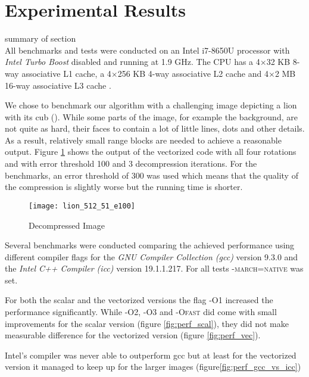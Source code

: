 \section{Experimental Results}\label{sec:exp}

summary of section\\

 All benchmarks and tests were conducted on an Intel
i7-8650U processor with \textit{Intel Turbo Boost} disabled and running at 1.9
GHz. The CPU has a 4$\times$32 KB 8-way associative L1 cache, a 4$\times$256 KB
4-way associative L2 cache and 4$\times$2 MB 16-way associative L3 cache
\cite{intel-opt-manual}.

We chose to benchmark our algorithm with a challenging image depicting a lion
with its cub (\cite{lions}). While some parts of the image, for example the
background, are not quite as hard, their faces to contain a lot of little lines,
dots and other details. As a result, relatively small range blocks are needed to
achieve a reasonable output. Figure \ref{fig:lions} shows the output of the
vectorized code with all four rotations and with error threshold 100 and 3
decompression iterations. For the benchmarks, an error threshold of 300 was used
which means that the quality of the compression is slightly worse but the
running time is shorter.

\begin{figure}[H]
  \centering
  \texttt{[image: lion\_512\_51\_e100]}
  \caption{Decompressed Image}
  \label{fig:lions}
\end{figure}


 Several benchmarks were conducted comparing the achieved
performance using different compiler flags for the \textit{GNU Compiler
  Collection (gcc)} version 9.3.0 and the \textit{Intel C++ Compiler (icc)}
version 19.1.1.217. For all tests \textsc{-march=native} was set.

For both the scalar and the vectorized versions the flag \textsc{-O1} increased
the performance significantly. While \textsc{-O2}, \textsc{-O3} and
\textsc{-Ofast} did come with small improvements for the scalar version (figure
\ref{fig:perf_scal}), they did not make measurable difference for the vectorized
version (figure \ref{fig:perf_vec}).

Intel's compiler was never able to outperform gcc but at least for the
vectorized version it managed to keep up for the larger images (figure\ref{fig:perf_gcc_vs_icc})

